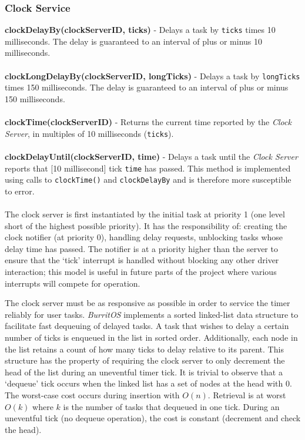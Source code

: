 \documentclass[twoside,a4paper]{refart}
\begin{document}
\subsubsection{Clock Service}

\textbf{clockDelayBy(clockServerID, ticks)} - Delays a task by \verb~ticks~ times 10 milliseconds. The delay is guaranteed to an interval of plus or minus 10 milliseconds.\\\\
\textbf{clockLongDelayBy(clockServerID, longTicks)} - Delays a task by \verb~longTicks~ times 150 milliseconds. The delay is guaranteed to an interval of plus or minus 150 milliseconds.\\\\
\textbf{clockTime(clockServerID)} - Returns the current time reported by the \textit{Clock Server}, in multiples of 10 milliseconds (\verb~ticks~).\\\\
\textbf{clockDelayUntil(clockServerID, time)} - Delays a task until the \textit{Clock Server} reports that [10 millisecond] tick \verb~time~ has passed. This method is implemented using calls to \verb~clockTime()~ and \verb~clockDelayBy~ and is therefore more susceptible to error.\\\\

The clock server is first instantiated by the initial task at priority 1 (one level short of the highest possible priority). It has the responsibility of: creating the clock notifier (at priority 0), handling delay requests, unblocking tasks whose delay time has passed. The notifier is at a priority higher than the server to ensure that the ‘tick’ interrupt is handled without blocking any other driver interaction; this model is useful in future parts of the project where various interrupts will compete for operation.

The clock server must be as responsive as possible in order to service the timer reliably for user tasks. \textit{BurritOS} implements a sorted linked-list data structure to facilitate fast dequeuing of delayed tasks. A task that wishes to delay a certain number of ticks is enqueued in the list in sorted order. Additionally, each node in the list retains a count of how many ticks to delay relative to its parent. This structure has the property of requiring the clock server to only decrement the head of the list during an uneventful timer tick. It is trivial to observe that a ‘dequeue’ tick occurs when the linked list has a set of nodes at the head with 0. The worst-case cost occurs during insertion with $O(n)$. Retrieval is at worst $O(k)$ where $k$ is the number of tasks that dequeued in one tick. During an uneventful tick (no dequeue operation), the cost is constant (decrement and check the head).
\end{document}
